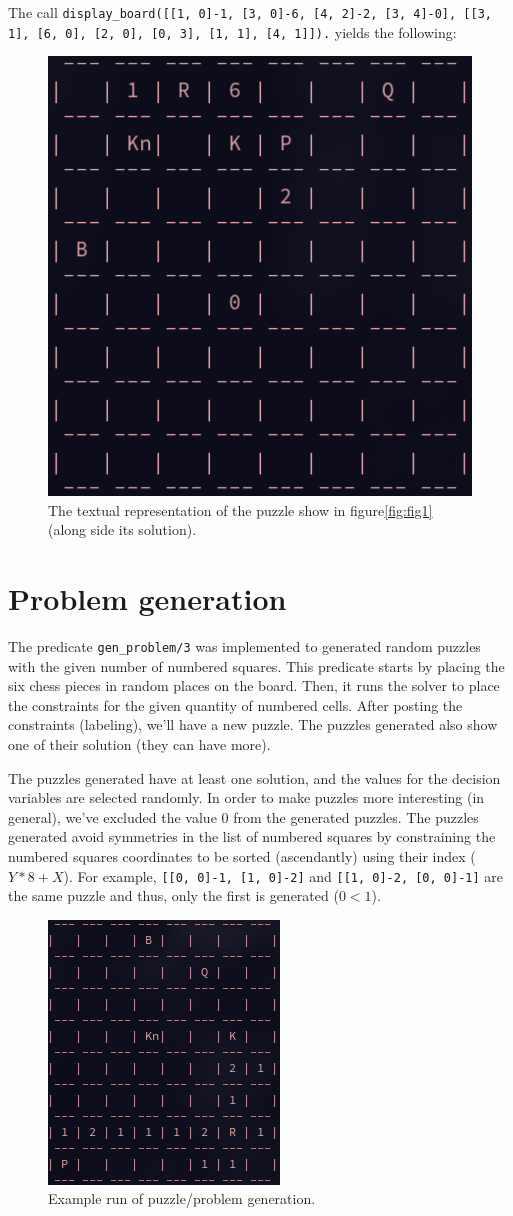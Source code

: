 \documentclass[runningheads]{llncs}
\newcommand{\inlinecode}[1]{\texttt{#1}}
\begin{document}
The call \inlinecode{display\_board([[1, 0]-1, [3, 0]-6, [4, 2]-2, [3, 4]-0],
[[3, 1], [6, 0], [2, 0], [0, 3], [1, 1], [4, 1]]).} yields the following:
\begin{figure}[H]
\includegraphics[width=0.4\linewidth]{figures/display_board_2.png}
  \centering
  \caption{The textual representation of the puzzle show in figure\ref{fig:fig1}
  (along side its solution).}\label{fig:fig3}
\end{figure}

\section{Problem generation}
The predicate \inlinecode{gen\_problem/3} was implemented to generated random
puzzles with the given number of numbered squares. This predicate starts by placing
the six chess pieces in random places on the board. Then, it runs the solver
to place the constraints for the given quantity of numbered cells. After posting
the constraints (labeling), we'll have a new puzzle. The puzzles generated also
show one of their solution (they can have more).

The puzzles generated have at least one solution, and the values for the decision
variables are selected randomly. In order to make puzzles more interesting
(in general), we've excluded the value 0 from the generated puzzles. The puzzles
generated avoid symmetries in the list of numbered squares by constraining the
numbered squares coordinates to be sorted (ascendantly) using their index ($Y * 8 + X$).
For example, \inlinecode{[[0, 0]-1, [1, 0]-2]} and \inlinecode{[[1, 0]-2, [0, 0]-1]}
are the same puzzle and thus, only the first is generated ($0 < 1$).

\begin{figure}[H]
\includegraphics[width=0.3\linewidth]{figures/gen_problem.png}
  \centering
  \caption{Example run of puzzle/problem generation.}\label{fig:fig4}
\end{figure}
\end{document}
